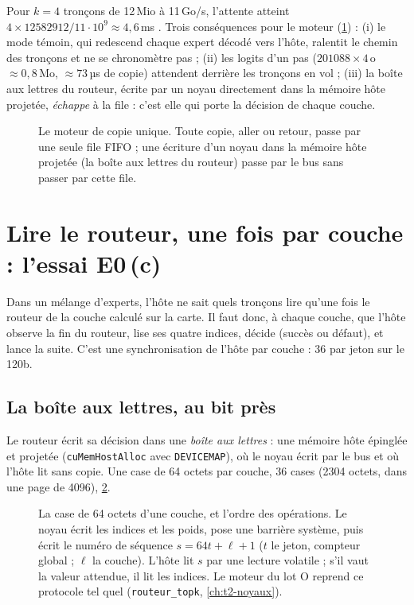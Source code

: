 Pour $k = 4$ tronçons de 12\,Mio à 11\,Go/s, l'attente atteint $4 \times \num{12582912} / 11\cdot10^9 \approx 4{,}6$\,ms \calc. Trois conséquences pour le moteur (\cref{fig:t2c-moteur-copie}) : (i) le mode témoin, qui redescend chaque expert décodé vers l'hôte, ralentit le chemin des tronçons et ne se chronomètre pas ; (ii) les logits d'un pas ($\num{201088} \times 4$\,o $\approx 0{,}8$\,Mo, $\approx 73$\,µs de copie) attendent derrière les tronçons en vol ; (iii) la boîte aux lettres du routeur, écrite par un noyau directement dans la mémoire hôte projetée, \emph{échappe} à la file : c'est elle qui porte la décision de chaque couche.

\begin{figure}[ht]
\centering
\SchemaChmMoteurCopie
\caption[Le moteur de copie unique]{Le moteur de copie unique. Toute copie, aller ou retour, passe par une seule file FIFO ; une écriture d'un noyau dans la mémoire hôte projetée (la boîte aux lettres du routeur) passe par le bus sans passer par cette file.}
\label{fig:t2c-moteur-copie}
\end{figure}

\section{Lire le routeur, une fois par couche : l'essai E0\,(c)}\label{sec:t2c-routeur}

Dans un mélange d'experts, l'hôte ne sait quels tronçons lire qu'une fois le routeur de la couche calculé sur la carte. Il faut donc, à chaque couche, que l'hôte observe la fin du routeur, lise ses quatre indices, décide (succès ou défaut), et lance la suite. C'est une synchronisation de l'hôte par couche : 36 par jeton sur le 120b.

\subsection{La boîte aux lettres, au bit près}

Le routeur écrit sa décision dans une \emph{boîte aux lettres} : une mémoire hôte épinglée et projetée (\texttt{cuMemHostAlloc} avec \texttt{DEVICEMAP}), où le noyau écrit par le bus et où l'hôte lit sans copie. Une case de 64 octets par couche, 36 cases (\num{2304} octets, dans une page de \num{4096}), \cref{fig:t2c-boite}.

\begin{figure}[ht]
\centering
\resizebox{\linewidth}{!}{\SchemaChmBoite}
\caption[La case de la boîte aux lettres d'une couche]{La case de 64 octets d'une couche, et l'ordre des opérations. Le noyau écrit les indices et les poids, pose une barrière système, puis écrit le numéro de séquence $s = 64t + \ell + 1$ ($t$ le jeton, compteur global ; $\ell$ la couche). L'hôte lit $s$ par une lecture volatile ; s'il vaut la valeur attendue, il lit les indices. Le moteur du lot O reprend ce protocole tel quel (\texttt{routeur\_topk}, \cref{ch:t2-noyaux}).}
\label{fig:t2c-boite}
\end{figure}

